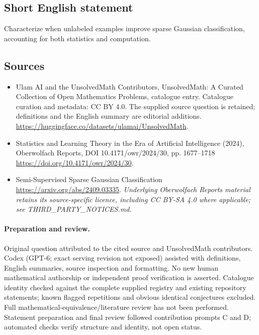\documentclass[11pt]{article}
\begin{document}
\subsection{Short English statement}
Characterize when unlabeled examples improve sparse Gaussian classification, accounting for both statistics and computation.
\subsection{Sources}
\begin{itemize}
\item[\hypertarget{source:statement:1}{S1}] Ulam AI and the UnsolvedMath Contributors, UnsolvedMath: A Curated Collection of Open Mathematics Problems, catalogue entry. Catalogue curation and metadata: CC BY 4.0. The supplied source question is retained; definitions and the English summary are editorial additions.
\url{https://huggingface.co/datasets/ulamai/UnsolvedMath}.
\item[\hypertarget{source:statement:2}{S2}] Statistics and Learning Theory in the Era of Artificial Intelligence (2024), Oberwolfach Reports, DOI 10.4171/owr/2024/30, pp. 1677--1718
\url{https://doi.org/10.4171/owr/2024/30}.
\item[\hypertarget{source:statement:3}{S3}] Semi-Supervised Sparse Gaussian Classification
\url{https://arxiv.org/abs/2409.03335}.
\textit{Underlying Oberwolfach Reports material retains its source-specific licence, including CC BY-SA 4.0 where applicable; see THIRD\_PARTY\_NOTICES.md.}
\end{itemize}
\paragraph{Preparation and review.}
Original question attributed to the cited source and UnsolvedMath contributors. Codex (GPT-6; exact serving revision not exposed) assisted with definitions, English summaries, source inspection and formatting. No new human mathematical authorship or independent proof verification is asserted. Catalogue identity checked against the complete supplied registry and existing repository statements; known flagged repetitions and obvious identical conjectures excluded. Full mathematical-equivalence/literature review has not been performed. Statement preparation and final review followed contribution prompts C and D; automated checks verify structure and identity, not open status.
\label{end:statement}
\end{document}
